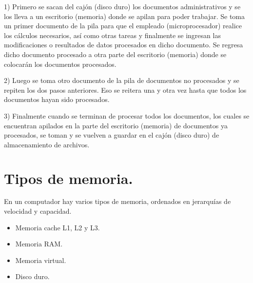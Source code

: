 \documentclass{article}
\begin{document}
 1) Primero se sacan del cajón (disco duro) los documentos administrativos y se los lleva a un escritorio (memoria) donde se apilan para poder trabajar. Se toma un primer documento de la pila para que el empleado (microprocesador) realice los cálculos necesarios, así como otras tareas y finalmente se ingresan las modificaciones o resultados de datos procesados en dicho documento. Se regresa dicho documento procesado a otra parte del escritorio (memoria) donde se colocarán los documentos procesados.
    
2) Luego se toma otro documento de la pila de documentos no procesados y se repiten los dos pasos anteriores. Eso se reitera una y otra vez hasta que todos los documentos hayan sido procesados.

3) Finalmente cuando se terminan de procesar todos los documentos, los cuales se encuentran apilados en la parte del escritorio (memoria) de documentos ya procesados, se toman y se vuelven a guardar en el cajón (disco duro) de almacenamiento de archivos. \cite{Desconocido}

\section{Tipos de memoria.} \label{contenido}
En un computador hay varios tipos de memoria, ordenados en jerarquías de velocidad y capacidad.

\begin{itemize}
    \item Memoria cache L1, L2 y L3.
    \item Memoria RAM.
    \item Memoria virtual.
    \item Disco duro. 
\end{itemize}
 
\end{document}
